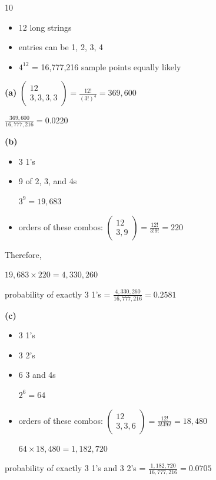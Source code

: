 \documentclass[12 pt]{article}
\begin{document}
    \begin{exercise}{10}
    \hfill

    \begin{itemize}
        \item 12 long strings
        \item entries can be 1, 2, 3, 4
        \item $4^{12}$ = 16,777,216 sample points equally likely
    \end{itemize}

    \textbf{(a)} $\begin{pmatrix}
        12 \\
        3, 3, 3, 3
    \end{pmatrix} = \frac{12!}{(3!)^4} = 369,600$

    $\frac{369,600}{16,777,216} = 0.0220$

    \textbf{(b)} 
    \begin{itemize}
        \item 3 1's
        \item 9 of 2, 3, and  4s

        $3^9 = 19,683$

        \item orders of these combos: $\begin{pmatrix}
            12 \\
            3, 9
        \end{pmatrix} = \frac{12!}{3!9!} = 220$
    \end{itemize}

    Therefore,

    $19,683 \times 220 = 4,330,260$

    probability of exactly 3 1's = $\frac{4,330,260}{16,777,216} = 0.2581$

    \textbf{(c)}
    \begin{itemize}
        \item 3 1's
        \item 3 2's
        \item 6 3 and 4s

        $2^6 = 64$

        \item orders of these combos: $\begin{pmatrix}
            12 \\
            3, 3, 6
        \end{pmatrix} = \frac{12!}{3!3!6!} = 18,480$

        $64 \times 18,480 = 1,182,720$
    \end{itemize}

    probability of exactly 3 1's and 3 2's = $\frac{1,182,720}{16,777,216} = 0.0705$ 
    \end{exercise}
\end{document}
